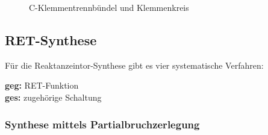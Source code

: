 \begin{figure}[H]
\centering
\subfloat[C-Klemmentrennbündel]{
	
	\label{fig:ret:klemmenbuendel}
}
\qquad
\subfloat[C-Klemmenkreis]{
	
	\label{fig:ret:klemmenkreis} 
}
\caption{C-Klemmentrennbündel und Klemmenkreis}
\label{fig:ret}
\end{figure}





\subsection{RET-Synthese}
Für die Reaktanzeintor-Synthese gibt es vier systematische Verfahren:

\begin{figure}[H]
\begin{center}
  
\end{center}
\end{figure}

\textbf{geg:} RET-Funktion\\
\textbf{ges:} zugehörige Schaltung\\


\subsubsection{Synthese mittels Partialbruchzerlegung}
